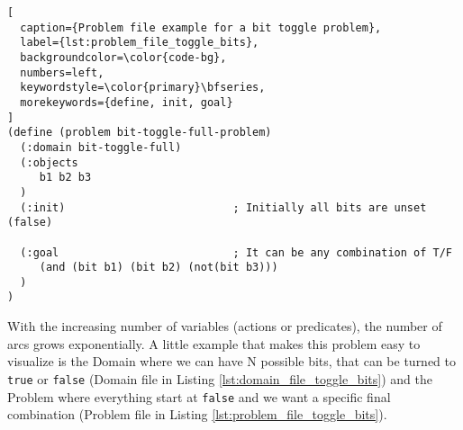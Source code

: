 \begin{lstlisting}[
  caption={Problem file example for a bit toggle problem},
  label={lst:problem_file_toggle_bits},
  backgroundcolor=\color{code-bg},
  numbers=left,
  keywordstyle=\color{primary}\bfseries,
  morekeywords={define, init, goal}
]
(define (problem bit-toggle-full-problem)
  (:domain bit-toggle-full)
  (:objects
     b1 b2 b3
  )
  (:init)                          ; Initially all bits are unset (false)

  (:goal                           ; It can be any combination of T/F
     (and (bit b1) (bit b2) (not(bit b3)))
  )
)
\end{lstlisting}

With the increasing number of variables (actions or predicates), the number of
arcs grows exponentially. A little example that makes this problem easy to visualize
is the Domain where we can have N possible bits, that can be turned to \texttt{true}
or \texttt{false} (Domain file in Listing \ref{lst:domain_file_toggle_bits}) and
the Problem where everything start at \texttt{false} and we want a specific final
combination (Problem file in Listing \ref{lst:problem_file_toggle_bits}).

